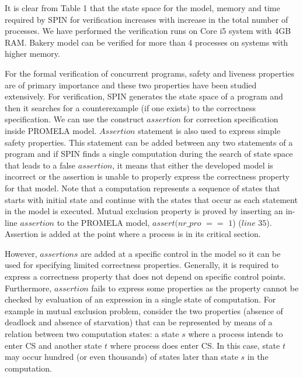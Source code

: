 \documentclass[conference]{IEEEtran}
\begin{document}
\vspace*{-4mm}It is clear from Table 1 that the state space for the model, memory and time required by SPIN for verification increases with increase in the total 
number of processes. We have performed the verification runs on Core i5 system with 4GB RAM. Bakery model can be verified for more than 4 processes
on systems with higher memory.

For the formal verification of concurrent programs, safety and liveness properties are of primary importance and these two properties 
have been studied extensively. For verification, SPIN generates the state space of a program and then it searches for a counterexample 
(if one exists) to the correctness specification. We can use the construct $assertion$ for correction specification inside PROMELA model. 
$Assertion$ statement is also used to express simple safety properties. This statement can be added between any two statements of a 
program and if SPIN finds a single computation during the search of state space that leads to a false $assertion$, it means that either the 
developed model is incorrect or the assertion is unable to properly express the correctness property for that model. Note that a computation
represents a sequence of states that starts with initial state and continue with the states that occur as each statement in the model is 
executed. Mutual exclusion property is proved by inserting an in-line $assertion$ to the PROMELA model, $assert(nr\_pro$ $==$ $1$) ($line$ $35$).
Assertion is added at the point where a process is in its critical section. 

However, $assertions$ are added at a specific control in the model so it can be used for specifying limited correctness properties. 
Generally, it is required to express a correctness property that does not depend on specific control points. Furthermore, $assertion$ fails 
to express some properties as the property cannot be checked by evaluation of an expression in a single state of computation. For example in
mutual exclusion problem, consider the two properties (absence of deadlock and absence of starvation) that can be represented by means of a 
relation between two computation states: a state $s$ where a process intends to enter CS and another state $t$ where process does enter CS. In this 
case, state $t$ may occur hundred (or even thousands) of states later than state $s$ in the computation. 
\end{document}
